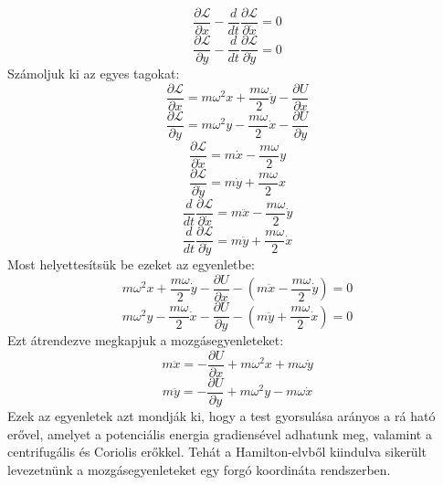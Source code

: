 \documentclass[../main.tex]{subfiles}
\begin{document}
\begin{equation}
    \frac{\partial \mathcal{L}}{\partial x} - \frac{d}{dt} \frac{\partial \mathcal{L}}{\partial \dot{x}} = 0
\end{equation}
\begin{equation}
    \frac{\partial \mathcal{L}}{\partial y} - \frac{d}{dt} \frac{\partial \mathcal{L}}{\partial \dot{y}} = 0
\end{equation}
Számoljuk ki az egyes tagokat:
\begin{equation}
    \frac{\partial \mathcal{L}}{\partial x} = m\omega^2 x + \frac{m\omega}{2} \dot{y} - \frac{\partial U}{\partial x}
\end{equation}
\begin{equation}
    \frac{\partial \mathcal{L}}{\partial y} = m\omega^2 y - \frac{m\omega}{2} \dot{x} - \frac{\partial U}{\partial y}
\end{equation}
\begin{equation}
    \frac{\partial \mathcal{L}}{\partial \dot{x}} = m \dot{x} - \frac{m\omega}{2} y
\end{equation}
\begin{equation}
    \frac{\partial \mathcal{L}}{\partial \dot{y}} = m \dot{y} + \frac{m\omega}{2} x
\end{equation}
\begin{equation}
    \frac{d}{dt} \frac{\partial \mathcal{L}}{\partial \dot{x}} = m \ddot{x} - \frac{m\omega}{2} \dot{y}
\end{equation}
\begin{equation}
    \frac{d}{dt} \frac{\partial \mathcal{L}}{\partial \dot{y}} = m \ddot{y} + \frac{m\omega}{2} \dot{x}
\end{equation}
Most helyettesítsük be ezeket az egyenletbe:
\begin{equation}
    m\omega^2 x + \frac{m\omega}{2} \dot{y} - \frac{\partial U}{\partial x} - (m \ddot{x} - \frac{m\omega}{2} \dot{y}) = 0
\end{equation}
\begin{equation}
    m\omega^2 y - \frac{m\omega}{2} \dot{x} - \frac{\partial U}{\partial y} - (m \ddot{y} + \frac{m\omega}{2} \dot{x}) = 0
\end{equation}
Ezt átrendezve megkapjuk a mozgásegyenleteket:
\begin{equation}
    m \ddot{x} = - \frac{\partial U}{\partial x} + m\omega^2 x + m\omega \dot{y}
\end{equation}
\begin{equation}
    m \ddot{y} = - \frac{\partial U}{\partial y} + m\omega^2 y - m\omega \dot{x}
\end{equation}
Ezek az egyenletek azt mondják ki, hogy a test gyorsulása arányos a rá ható erővel, amelyet a potenciális energia gradiensével adhatunk meg, valamint a centrifugális és Coriolis erőkkel.
Tehát a Hamilton-elvből kiindulva sikerült levezetnünk a mozgásegyenleteket egy forgó koordináta rendszerben.
\end{document}
